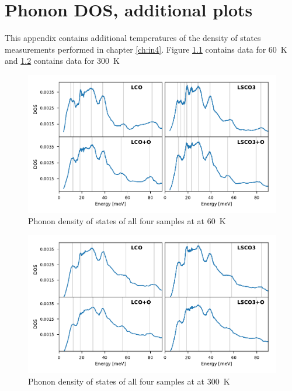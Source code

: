 \chapter{Phonon DOS, additional plots}\label{app:pdos_plots}
This appendix contains additional temperatures of the density of states measurements performed in chapter \ref{ch:in4}. Figure \ref{fig:gdos_60k} contains data for \SI{60}{\kelvin} and \ref{fig:gdos_300k} contains data for \SI{300}{\kelvin}

\begin{figure}
    \centering
    \includegraphics[width=\textwidth]{fig/gdos/in4_60K.pdf}
    \caption[gDOS at \SI{60}{\kelvin}]{Phonon density of states of all four samples at at \SI{60}{\kelvin}}
    \label{fig:gdos_60k}
\end{figure}

\begin{figure}
    \centering
    \includegraphics[width=\textwidth]{fig/gdos/in4_300K.pdf}
    \caption[gDOS at \SI{300}{\kelvin}]{Phonon density of states of all four samples at at \SI{300}{\kelvin}}
    \label{fig:gdos_300k}
\end{figure}